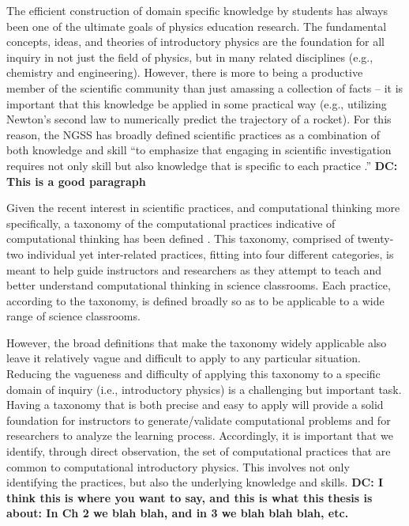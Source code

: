 \documentclass{msuphddissertation}
\begin{document}
\begin{doublespace}
The efficient construction of domain specific knowledge by students has always been one of the ultimate goals of physics education research.  The fundamental concepts, ideas, and theories of introductory physics are the foundation for all inquiry in not just the field of physics, but in many related disciplines (e.g., chemistry and engineering).  However, there is more to being a productive member of the scientific community than just amassing a collection of facts -- it is important that this knowledge be applied in some practical way (e.g., utilizing Newton's second law to numerically predict the trajectory of a rocket).  For this reason, the NGSS has broadly defined scientific practices as a combination of both knowledge and skill ``to emphasize that engaging in scientific investigation requires not only skill but also knowledge that is specific to each practice \cite{NGSS2013}.''  %
{\bf DC: This is a good paragraph}

Given the recent interest in scientific practices, and computational thinking more specifically, a taxonomy of the computational practices indicative of computational thinking has been defined \cite{Weintrop2015}.  This taxonomy, comprised of twenty-two individual yet inter-related practices, fitting into four different categories, is meant to help guide instructors and researchers as they attempt to teach and better understand computational thinking in science classrooms.  Each practice, according to the taxonomy, is defined broadly so as to be applicable to a wide range of science classrooms.

However, the broad definitions that make the taxonomy widely applicable also leave it relatively vague and difficult to apply to any particular situation.  Reducing the vagueness and difficulty of applying this taxonomy to a specific domain of inquiry (i.e., introductory physics) is a challenging but important task.  Having a taxonomy that is both precise and easy to apply will provide a solid foundation for instructors to generate/validate computational problems and for researchers to analyze the learning process.  Accordingly, it is important that we identify, through direct observation, the set of computational practices that are common to computational introductory physics.  This involves not only identifying the practices, but also the underlying knowledge and skills. {\bf DC: I think this is where you want to say, and this is what this thesis is about: In Ch 2 we blah blah, and in 3 we blah blah blah, etc.}


\end{doublespace}
\end{document}
